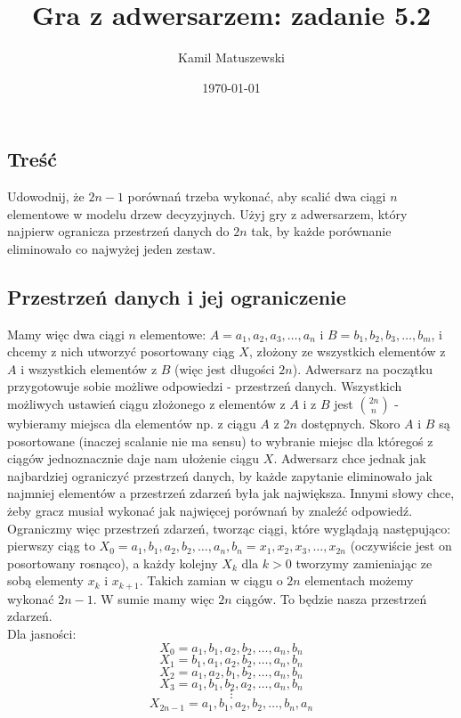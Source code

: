 \documentclass[a4paper]{article}
\title{Gra z adwersarzem: zadanie 5.2}
\author{Kamil Matuszewski}
\date{\today}
\begin{document}
\maketitle
\setlength{\parindent}{0.5ex}
\setlength{\parskip}{1.5ex}
\newcommand{\R}{\mathbb{R}}
\newcommand{\N}{\mathbb{N}}

\subsection*{Treść}
Udowodnij, że $2n-1$ porównań trzeba wykonać, aby scalić dwa ciągi $n$ elementowe w modelu drzew decyzyjnych. Użyj gry z adwersarzem, który najpierw ogranicza przestrzeń danych do $2n$ tak, by każde porównanie eliminowało co najwyżej jeden zestaw.

\subsection*{Przestrzeń danych i jej ograniczenie}
Mamy więc dwa ciągi $n$ elementowe: $A=a_1,a_2,a_3,\dots ,a_n$ i $B=b_1, b_2, b_3, \dots , b_m$, i chcemy z nich utworzyć posortowany ciąg $X$, złożony ze wszystkich elementów z $A$ i wszystkich elementów z $B$ (więc jest długości $2n$). Adwersarz na początku przygotowuje sobie możliwe odpowiedzi - przestrzeń danych. Wszystkich możliwych ustawień ciągu złożonego z elementów z $A$ i z $B$ jest ${2n \choose n}$ - wybieramy miejsca dla elementów np. z ciągu $A$ z $2n$ dostępnych. Skoro $A$ i $B$ są posortowane (inaczej scalanie nie ma sensu) to wybranie miejsc dla któregoś z ciągów jednoznacznie daje nam ułożenie ciągu $X$. Adwersarz chce jednak jak najbardziej ograniczyć przestrzeń danych, by każde zapytanie eliminowało jak najmniej elementów a przestrzeń zdarzeń była jak największa. Innymi słowy chce, żeby gracz musiał wykonać jak najwięcej porównań by znaleźć odpowiedź.\\
Ograniczmy więc przestrzeń zdarzeń, tworząc ciągi, które wyglądają następująco: pierwszy ciąg to $X_0=a_1,b_1,a_2,b_2,\dots ,a_n,b_n=x_1,x_2,x_3,\dots,x_{2n}$ (oczywiście jest on posortowany rosnąco), a każdy kolejny $X_k$ dla $k>0$ tworzymy zamieniając ze sobą elementy $x_k$ i $x_{k+1}$. Takich zamian w ciągu o $2n$ elementach możemy wykonać $2n-1$. W sumie mamy więc $2n$ ciągów. To będzie nasza przestrzeń zdarzeń.\\
Dla jasności:
$$X_0=a_1,b_1,a_2,b_2,\dots , a_n,b_n$$
$$X_1=b_1,a_1,a_2,b_2,\dots , a_n,b_n$$
$$X_2=a_1,a_2,b_1,b_2,\dots , a_n,b_n$$
$$X_3=a_1,b_1,b_2,a_2,\dots , a_n,b_n$$
$$\vdots$$
$$X_{2n-1}=a_1,b_1,a_2,b_2,\dots , b_n,a_n$$
\clearpage
\end{document}
